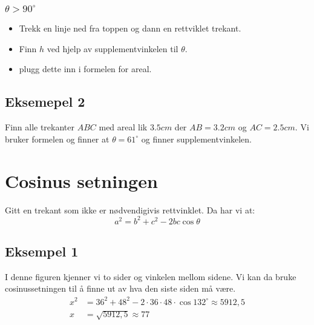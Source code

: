 \documentclass{article}
\begin{document}
\subsubsection{$\theta > 90^{\circ}$}
\label{sec-1-2-2}
\begin{itemize}
\item Trekk en linje ned fra toppen og dann en rettviklet trekant.
\item Finn $h$ ved hjelp av supplementvinkelen til $\theta$.
\item plugg dette inn i formelen for areal.
\end{itemize}
\subsection{Eksemepel 2}
\label{sec-1-3}
Finn alle trekanter $ABC$ med areal lik $3.5cm$ der $AB = 3.2cm$ og $AC = 2.5cm$. 
Vi bruker formelen og finner at $\theta = 61^{\circ}$ og finner supplementvinkelen.

\section{Cosinus setningen}
\label{sec-2}
Gitt en trekant som ikke er nødvendigivis rettvinklet. Da har vi at:
\[
a^2 = b^2 + c^2 -2bc \cos{\theta}
\]

\subsection{Eksempel 1}
\label{sec-2-1}
\begin{figure}[h!]
\end{figure}
I denne figuren kjenner vi to sider og vinkelen mellom sidene. 
Vi kan da bruke cosinussetningen til å finne ut av hva den siste siden må være. 
\begin{align*}
x^2 & = 36^2 + 48^2 -2\cdot 36 \cdot 48 \cdot \cos{132^{\circ}} \approx 5912,5\\
x & = \sqrt{5912,5} \approx 77
\end{align*}
\end{document}
